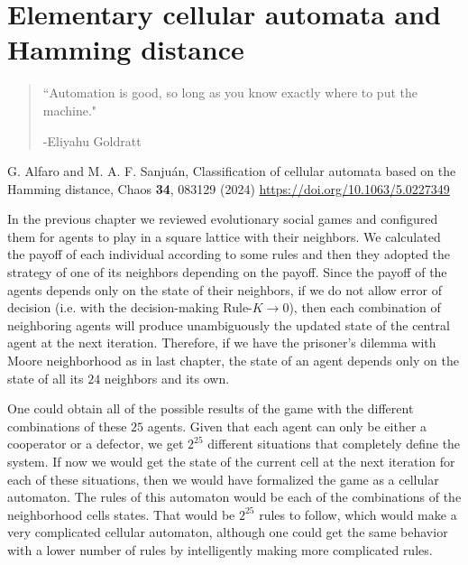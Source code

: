 \chapter{Elementary cellular automata and Hamming distance}
\label{chap:HammingECA}

\renewcommand\labelenumi{(\roman{enumi})}
\renewcommand\theenumi\labelenumi


\begin{quotation}
	\vspace{-3cm}
    \begin{flushright}
    \begin{minipage}[t][5cm][b]{0.5\textwidth}
    { ``Automation is good, so long as you know exactly where to put the machine."}
    
    \bigskip
    
    -{\small  Eliyahu Goldratt}
    \end{minipage}
    \end{flushright}
    
    \vspace{0.5cm}
\end{quotation}

\vspace{0.5cm}

G. Alfaro and M. A. F. Sanjuán,
Classification of cellular automata based on the Hamming
distance,
Chaos \textbf{34}, 083129 (2024)
\url{https://doi.org/10.1063/5.0227349}

\vspace{1cm}


In the previous chapter we reviewed evolutionary social games and configured them for agents to play in a square lattice with their neighbors. We calculated the payoff of each individual according to some rules and then they adopted the strategy of one of its neighbors depending on the payoff. Since the payoff of the agents depends only on the state of their neighbors, if we do not allow error of decision (i.e. with the decision-making Rule-$K \to 0$), then each combination of neighboring agents will produce unambiguously the updated state of the central agent at the next iteration. Therefore, if we have the prisoner's dilemma with Moore neighborhood as in last chapter, the state of an agent depends only on the state of all its $24$ neighbors and its own. 

One could obtain all of the possible results of the game with the different combinations of these $25$ agents. Given that each agent can only be either a cooperator or a defector, we get $2^{25}$ different situations that completely define the system. If now we would get the state of the current cell at the next iteration for each of these situations, then we would have formalized the game as a cellular automaton. The rules of this automaton would be each of the combinations of the neighborhood cells states. That would be $2^{25}$ rules to follow, which would make a very complicated cellular automaton, although one could get the same behavior with a lower number of rules by intelligently making more complicated rules. 

